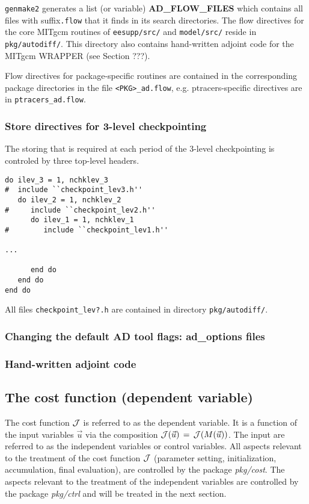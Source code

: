 {\tt genmake2} generates a list (or variable) {\bf AD\_FLOW\_FILES}
which contains all files with suffix{\tt .flow} that it finds 
in its search directories.
The flow directives for the core MITgcm routines of
{\tt eesupp/src/} and {\tt model/src/}
reside in {\tt pkg/autodiff/}.
This directory also contains hand-written adjoint code
for the MITgcm WRAPPER (see Section ???).

Flow directives for package-specific routines are contained in
the corresponding package directories in the file
{\tt <PKG>\_ad.flow}, e.g. ptracers-specific directives are in
{\tt ptracers\_ad.flow}.

\subsubsection{Store directives for 3-level checkpointing}

The storing that is required at each period of the
3-level checkpointing is controled by three
top-level headers.

\begin{verbatim}
do ilev_3 = 1, nchklev_3
#  include ``checkpoint_lev3.h''
   do ilev_2 = 1, nchklev_2
#     include ``checkpoint_lev2.h''
      do ilev_1 = 1, nchklev_1
#        include ``checkpoint_lev1.h''

...

      end do
   end do
end do
\end{verbatim}

All files {\tt checkpoint\_lev?.h} are contained in directory
{\tt pkg/autodiff/}.


\subsubsection{Changing the default AD tool flags: ad\_options files}


\subsubsection{Hand-written adjoint code}


\subsection{The cost function (dependent variable)
\label{section_cost}}

The cost function $ {\cal J} $ is referred to as the {\sf dependent variable}.
It is a function of the input variables $ \vec{u} $ via the composition
$ {\cal J}(\vec{u}) \, = \, {\cal J}(M(\vec{u})) $. 
The input are referred to as the
{\sf independent variables} or {\sf control variables}.
All aspects relevant to the treatment of the cost function $ {\cal J} $
(parameter setting, initialization, accumulation, 
final evaluation), are controlled by the package {\it pkg/cost}.
The aspects relevant to the treatment of the independent variables
are controlled by the package {\it pkg/ctrl} and will be treated
in the next section.

